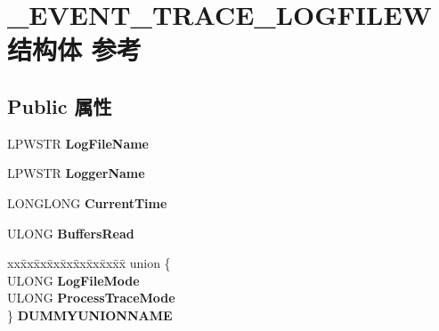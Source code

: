 \hypertarget{struct___e_v_e_n_t___t_r_a_c_e___l_o_g_f_i_l_e_w}{}\section{\+\_\+\+E\+V\+E\+N\+T\+\_\+\+T\+R\+A\+C\+E\+\_\+\+L\+O\+G\+F\+I\+L\+E\+W结构体 参考}
\label{struct___e_v_e_n_t___t_r_a_c_e___l_o_g_f_i_l_e_w}
\subsection*{Public 属性}
\begin{DoxyCompactItemize}
\item 
\mbox{\label{struct___e_v_e_n_t___t_r_a_c_e___l_o_g_f_i_l_e_w_a4aaa154744f7143e5f01c22d14c8f592}} 
L\+P\+W\+S\+TR {\bfseries Log\+File\+Name}
\item 
\mbox{\label{struct___e_v_e_n_t___t_r_a_c_e___l_o_g_f_i_l_e_w_a589c0f88fbb37ebb94040a145192477a}} 
L\+P\+W\+S\+TR {\bfseries Logger\+Name}
\item 
\mbox{\label{struct___e_v_e_n_t___t_r_a_c_e___l_o_g_f_i_l_e_w_af946ff1a20548c99b4a11235b541e037}} 
L\+O\+N\+G\+L\+O\+NG {\bfseries Current\+Time}
\item 
\mbox{\label{struct___e_v_e_n_t___t_r_a_c_e___l_o_g_f_i_l_e_w_a79b0fc27279b5ce5449fefbb8e3ebe4f}} 
U\+L\+O\+NG {\bfseries Buffers\+Read}
\item 
\mbox{\label{struct___e_v_e_n_t___t_r_a_c_e___l_o_g_f_i_l_e_w_ab50857b82302a76e09868c2d409e15c3}} 
\begin{tabbing}
xx\=xx\=xx\=xx\=xx\=xx\=xx\=xx\=xx\=\kill
union \{\\
\>ULONG {\bfseries LogFileMode}\\
\>ULONG {\bfseries ProcessTraceMode}\\
\} {\bfseries DUMMYUNIONNAME}\\


\end{tabbing}
\end{DoxyCompactItemize}
